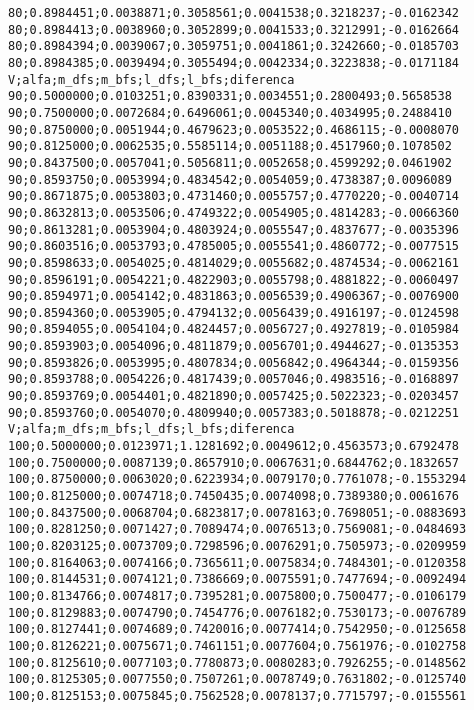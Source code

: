 \documentclass[brazil,times]{abnt}
\begin{document}
{\begin{verbatim}
80;0.8984451;0.0038871;0.3058561;0.0041538;0.3218237;-0.0162342
80;0.8984413;0.0038960;0.3052899;0.0041533;0.3212991;-0.0162664
80;0.8984394;0.0039067;0.3059751;0.0041861;0.3242660;-0.0185703
80;0.8984385;0.0039494;0.3055494;0.0042334;0.3223838;-0.0171184
V;alfa;m_dfs;m_bfs;l_dfs;l_bfs;diferenca
90;0.5000000;0.0103251;0.8390331;0.0034551;0.2800493;0.5658538
90;0.7500000;0.0072684;0.6496061;0.0045340;0.4034995;0.2488410
90;0.8750000;0.0051944;0.4679623;0.0053522;0.4686115;-0.0008070
90;0.8125000;0.0062535;0.5585114;0.0051188;0.4517960;0.1078502
90;0.8437500;0.0057041;0.5056811;0.0052658;0.4599292;0.0461902
90;0.8593750;0.0053994;0.4834542;0.0054059;0.4738387;0.0096089
90;0.8671875;0.0053803;0.4731460;0.0055757;0.4770220;-0.0040714
90;0.8632813;0.0053506;0.4749322;0.0054905;0.4814283;-0.0066360
90;0.8613281;0.0053904;0.4803924;0.0055547;0.4837677;-0.0035396
90;0.8603516;0.0053793;0.4785005;0.0055541;0.4860772;-0.0077515
90;0.8598633;0.0054025;0.4814029;0.0055682;0.4874534;-0.0062161
90;0.8596191;0.0054221;0.4822903;0.0055798;0.4881822;-0.0060497
90;0.8594971;0.0054142;0.4831863;0.0056539;0.4906367;-0.0076900
90;0.8594360;0.0053905;0.4794132;0.0056439;0.4916197;-0.0124598
90;0.8594055;0.0054104;0.4824457;0.0056727;0.4927819;-0.0105984
90;0.8593903;0.0054096;0.4811879;0.0056701;0.4944627;-0.0135353
90;0.8593826;0.0053995;0.4807834;0.0056842;0.4964344;-0.0159356
90;0.8593788;0.0054226;0.4817439;0.0057046;0.4983516;-0.0168897
90;0.8593769;0.0054401;0.4821890;0.0057425;0.5022323;-0.0203457
90;0.8593760;0.0054070;0.4809940;0.0057383;0.5018878;-0.0212251
V;alfa;m_dfs;m_bfs;l_dfs;l_bfs;diferenca
100;0.5000000;0.0123971;1.1281692;0.0049612;0.4563573;0.6792478
100;0.7500000;0.0087139;0.8657910;0.0067631;0.6844762;0.1832657
100;0.8750000;0.0063020;0.6223934;0.0079170;0.7761078;-0.1553294
100;0.8125000;0.0074718;0.7450435;0.0074098;0.7389380;0.0061676
100;0.8437500;0.0068704;0.6823817;0.0078163;0.7698051;-0.0883693
100;0.8281250;0.0071427;0.7089474;0.0076513;0.7569081;-0.0484693
100;0.8203125;0.0073709;0.7298596;0.0076291;0.7505973;-0.0209959
100;0.8164063;0.0074166;0.7365611;0.0075834;0.7484301;-0.0120358
100;0.8144531;0.0074121;0.7386669;0.0075591;0.7477694;-0.0092494
100;0.8134766;0.0074817;0.7395281;0.0075800;0.7500477;-0.0106179
100;0.8129883;0.0074790;0.7454776;0.0076182;0.7530173;-0.0076789
100;0.8127441;0.0074689;0.7420016;0.0077414;0.7542950;-0.0125658
100;0.8126221;0.0075671;0.7461151;0.0077604;0.7561976;-0.0102758
100;0.8125610;0.0077103;0.7780873;0.0080283;0.7926255;-0.0148562
100;0.8125305;0.0077550;0.7507261;0.0078749;0.7631802;-0.0125740
100;0.8125153;0.0075845;0.7562528;0.0078137;0.7715797;-0.0155561

\end{verbatim}}
\end{document}
